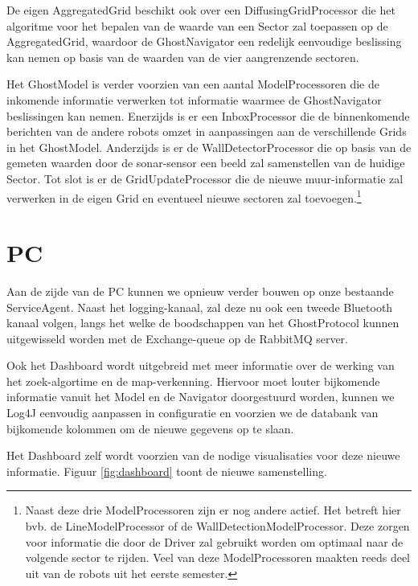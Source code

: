 \documentclass[12pt,a4paper]{report}
\begin{document}
De eigen AggregatedGrid beschikt ook over een DiffusingGridProcessor die het algoritme voor het bepalen van de waarde van een Sector zal toepassen op de AggregatedGrid, waardoor de GhostNavigator een redelijk eenvoudige beslissing kan nemen op basis van de waarden van de vier aangrenzende sectoren.

Het GhostModel is verder voorzien van een aantal ModelProcessoren die de inkomende informatie verwerken tot informatie waarmee de GhostNavigator beslissingen kan nemen. Enerzijds is er een InboxProcessor die de binnenkomende berichten van de andere robots omzet in aanpassingen aan de verschillende Grids in het GhostModel. Anderzijds is er de WallDetectorProcessor die op basis van de gemeten waarden door de sonar-sensor een beeld zal samenstellen van de huidige Sector. Tot slot is er de GridUpdateProcessor die de nieuwe muur-informatie zal verwerken in de eigen Grid en eventueel nieuwe sectoren zal toevoegen.\footnote{Naast deze drie ModelProcessoren zijn er nog andere actief. Het betreft hier bvb. de LineModelProcessor of de WallDetectionModelProcessor. Deze zorgen voor informatie die door de Driver zal gebruikt worden om optimaal naar de volgende sector te rijden. Veel van deze ModelProcessoren maakten reeds deel uit van de robots uit het eerste semester.}

\section{PC}

Aan de zijde van de PC kunnen we opnieuw verder bouwen op onze bestaande ServiceAgent. Naast het logging-kanaal, zal deze nu ook een tweede Bluetooth kanaal volgen, langs het welke de boodschappen van het GhostProtocol kunnen uitgewisseld worden met de Exchange-queue op de RabbitMQ server.

Ook het Dashboard wordt uitgebreid met meer informatie over de werking van het zoek-algortime en de map-verkenning. Hiervoor moet louter bijkomende informatie vanuit het Model en de Navigator doorgestuurd worden, kunnen we Log4J eenvoudig aanpassen in configuratie en voorzien we de databank van bijkomende kolommen om de nieuwe gegevens op te slaan.

Het Dashboard zelf wordt voorzien van de nodige visualisaties voor deze nieuwe informatie. Figuur \ref{fig:dashboard} toont de nieuwe samenstelling.
\end{document}
